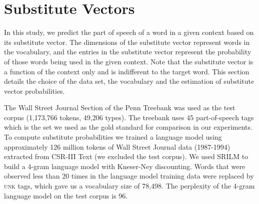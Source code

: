 \section{Substitute Vectors}
\label{sec:lm}

In this study, we predict the part of speech of a word in a given
context based on its substitute vector.  The dimensions of the
substitute vector represent words in the vocabulary, and the entries
in the substitute vector represent the probability of those words
being used in the given context.  Note that the substitute vector is a
function of the context only and is indifferent to the target word.
This section details the choice of the data set, the vocabulary and
the estimation of substitute vector probabilities.

The Wall Street Journal Section of the Penn Treebank \cite{treebank3}
was used as the test corpus (1,173,766 tokens, 49,206 types).
The treebank uses 45 part-of-speech tags which is the set we used as
the gold standard for comparison in our experiments.
To compute substitute probabilities we trained a language model using
approximately 126 million tokens of Wall Street Journal data
(1987-1994) extracted from CSR-III Text \cite{csr3text} (we excluded
the test corpus).
We used SRILM \cite{Stolcke2002} to build a 4-gram language model with
Kneser-Ney discounting.
Words that were observed less than 20 times in the language model
training data were replaced by \textsc{unk} tags, which gave us a
vocabulary size of 78,498.
The perplexity of the 4-gram language model on the test corpus is 96.

